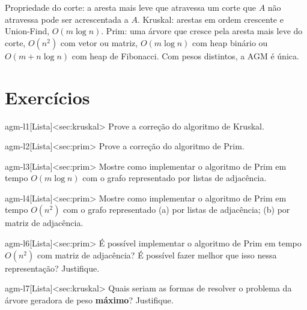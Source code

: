 \begin{chave}
Propriedade do corte: a aresta mais leve que atravessa um corte que $A$ não atravessa pode ser acrescentada a $A$. Kruskal: arestas em ordem crescente e Union-Find, $O(m\log n)$. Prim: uma árvore que cresce pela aresta mais leve do corte, $O(n^2)$ com vetor ou matriz, $O(m\log n)$ com heap binário ou $O(m+n\log n)$ com heap de Fibonacci. Com pesos distintos, a AGM é única.
\end{chave}

\section{Exercícios}
\excurso
\begin{exercicio}{agm-l1}[Lista]<sec:kruskal>
Prove a correção do algoritmo de Kruskal.
\end{exercicio}
\begin{exercicio}{agm-l2}[Lista]<sec:prim>
Prove a correção do algoritmo de Prim.
\end{exercicio}
\begin{exercicio}{agm-l3}[Lista]<sec:prim>
Mostre como implementar o algoritmo de Prim em tempo $O(m\log n)$ com o grafo representado por listas de adjacência.
\end{exercicio}
\begin{exercicio}{agm-l4}[Lista]<sec:prim>
Mostre como implementar o algoritmo de Prim em tempo $O(n^2)$ com o grafo representado (a) por listas de adjacência; (b) por matriz de adjacência.
\end{exercicio}
\begin{exercicio}{agm-l6}[Lista]<sec:prim>
É possível implementar o algoritmo de Prim em tempo $O(n^2)$ com matriz de adjacência? É possível fazer melhor que isso nessa representação? Justifique.
\end{exercicio}
\begin{exercicio}{agm-l7}[Lista]<sec:kruskal>
Quais seriam as formas de resolver o problema da árvore geradora de peso \textbf{máximo}? Justifique.
\end{exercicio}

